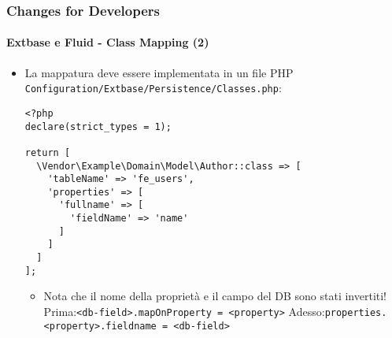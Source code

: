 
\begin{frame}[fragile]
	\frametitle{Changes for Developers}
	\framesubtitle{Extbase e Fluid - Class Mapping (2)}

	\lstset{basicstyle=\tiny\ttfamily}

	\begin{itemize}
		\item La mappatura deve essere implementata in un file PHP \texttt{Configuration/Extbase/Persistence/Classes.php}:

\begin{lstlisting}
<?php
declare(strict_types = 1);

return [
  \Vendor\Example\Domain\Model\Author::class => [
    'tableName' => 'fe_users',
    'properties' => [
      'fullname' => [
        'fieldName' => 'name'
      ]
    ]
  ]
];
\end{lstlisting}

		\begin{itemize}\smaller
			\item[\ding{228}] Nota che il nome della proprietà e il campo del DB sono stati invertiti!\newline
				Prima:\tabto{1.6cm}\texttt{<db-field>.mapOnProperty = <property>}\newline
				Adesso:\tabto{1.6cm}\texttt{properties.<property>.fieldname = <db-field>}
		\end{itemize}\normalsize

	\end{itemize}

\end{frame}


